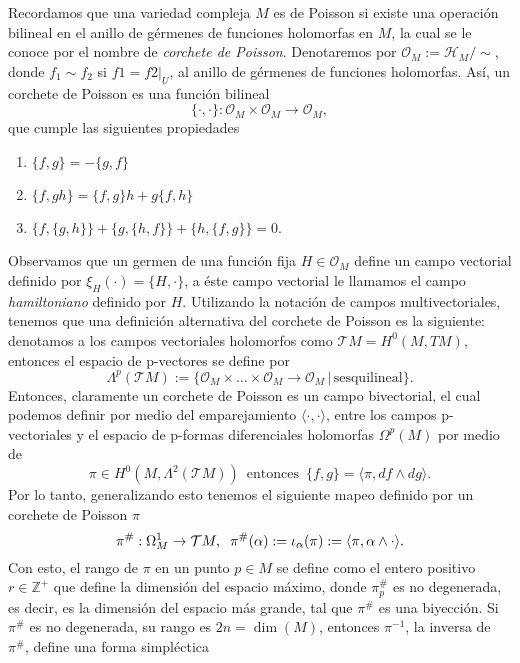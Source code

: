 \documentclass[letterpaper]{report}
\newcommand{\zah}{\ensuremath{ \mathbb Z }}
\begin{document}
Recordamos que una variedad compleja $M$ es de Poisson si existe una operaci\'on bilineal en el anillo de g\'ermenes de 
funciones holomorfas en $M$, la cual se le conoce por el nombre de \textit{corchete de Poisson}. Denotaremos por $\mathcal{O}_M:=\mathcal{H}_M/\sim$, donde $f_1\sim f_2$ si 
$f1=f2|_U$, al anillo de g\'ermenes de funciones holomorfas. As\'i, un corchete de Poisson es una funci\'on bilineal
\[
\{\cdot,\cdot\}:\mathcal{O}_M\times\mathcal{O}_M\rightarrow\mathcal{O}_M,
\]
que cumple las siguientes propiedades
\begin{enumerate}
\item $\{f,g\} = -\{g,f\}$
\item $\{f,gh\}=\{f,g\}h + g\{f,h\}$
\item $\{f,\{g,h\}\}+\{g,\{h,f\}\} + \{h,\{ f,g\}\}=0$.
\end{enumerate}
\noindent Observamos que un germen de una funci\'on fija $H\in\mathcal{O}_M$ define un campo vectorial definido por $\xi_H(\cdot)=\{H,\cdot\}$,
a \'este campo vectorial le llamamos el campo \textit{hamiltoniano} definido por $H$. Utilizando la notaci\'on de campos multivectoriales, 
tenemos que una definici\'on alternativa del corchete de Poisson es la siguiente: denotamos a los campos vectoriales holomorfos como $\mathcal{T}M=H^0(M,TM)$,
entonces el espacio de p-vectores se define por 
\[
        \Lambda^{p}(\mathcal{T}M):=\{\mathcal{O}_M\times\dots\times\mathcal{O}_M\rightarrow\mathcal{O}_M\,\vert\,\text{sesquilineal}\}.
\]
Entonces, claramente un corchete de Poisson es un campo bivectorial, el cual podemos definir por medio del emparejamiento $\langle\cdot,\cdot\rangle$,
entre los campos p-vectoriales y el espacio de p-formas diferenciales holomorfas $\Omega^{p}(M)$ por medio de
\[
        \pi\in H^0(M,\Lambda^2(\mathcal{T}M))\,\text{ entonces }\,\{f,g\}=\langle \pi,df\wedge dg\rangle.
\]
Por lo tanto, generalizando esto tenemos el siguiente mapeo definido por un corchete de Poisson $\pi$
\[
        \pi^{\#}:\Omega^1_M\rightarrow\mathcal{T}M,\hspace{0.2cm}\pi^{\#}(\alpha):=\iota_{\alpha}(\pi):=\langle\pi,\alpha\wedge\cdot\rangle.
\]
\noindent Con esto, el rango de $\pi$ en un punto $p\in M$ se define como el entero positivo $r\in \zah^{+}$ que define la dimensi\'on del
espacio m\'aximo, donde $\pi^{\#}_p$ es no degenerada, es decir, es la dimensi\'on del espacio m\'as grande, tal que $\pi^{\#}$ es una
biyecci\'on. Si $\pi^{\#}$ es no degenerada, su rango es $2n=\dim(M)$, entonces $\pi^{-1}$, la inversa de $\pi^{\#}$, define una forma simpl\'ectica
\end{document}
